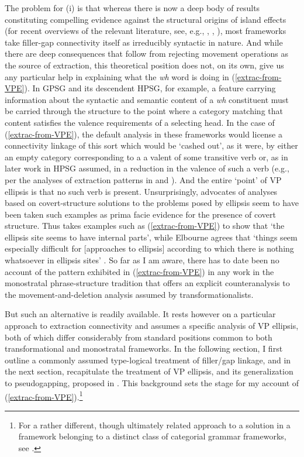 \documentclass[output=paper,colorlinks,citecolor=brown]{langscibook}
\begin{document}
The problem for (i) is that whereas there is now a deep body of
results constituting compelling evidence against the structural
origins of island effects (for recent overviews of the relevant
literature, see, e.g., \citet{chaves-putnam2020}, \citet{kubotalevineBook}, \citet{liu-et-al2022}),
most frameworks take filler-gap connectivity itself as irreducibly
syntactic in nature. And while there are deep consequences that follow
from rejecting movement operations as the source of extraction, this
theoretical position does not, on its own, give us any particular help
in explaining what the \textit{wh} word is doing in (\ref{extrac-from-VPE}). In
GPSG and its descendent HPSG, for example, a feature carrying
information about the syntactic and semantic content of a \textit{wh}
constituent must be carried through the structure to the point where a
category matching that content satisfies the valence requirements of a
selecting head. In the case of (\ref{extrac-from-VPE}), the default analysis
in these frameworks would license a connectivity linkage of this sort
which would be `cashed out', as it were, by either an empty category
corresponding to a a valent of some transitive verb or, as in later
work in HPSG assumed, in a reduction in the valence of such a verb
(e.g., per the analyses of extraction patterns in \citet{NoordBouma94} and
\citet{BoumaMaloufea01}). And the entire `point' of VP ellipsis is that no such
verb is present. Unsurprisingly, advocates of analyses based on
covert-structure solutions to the problems posed by ellipsis seem to
have been taken such examples as prima facie evidence for the presence
of covert structure.  Thus \citet{johnson2001} takes examples such as
(\ref{extrac-from-VPE}) to show that `the ellipsis site seems to have
internal parts', while Elbourne agrees that `things seem especially
difficult for [approaches to ellipsis] according to which there is
nothing whatsoever in ellipsis sites' \citep[216]{Elbourne2008}.  So far as I
am aware, there has to date been no account of the pattern exhibited
in (\ref{extrac-from-VPE}) in any work in the monostratal phrase-structure
tradition that offers an explicit counteranalysis to the
movement-and-deletion analysis assumed by transformationalists.

But such an alternative is readily available. It rests however on a
particular approach to extraction connectivity and assumes a specific
analysis of VP ellipsis, both of which differ considerably from
standard positions common to both transformational and monostratal
frameworks. In the following section, I first outline a commonly
assumed type-logical treatment of filler/gap linkage, and in the next
section, recapitulate the treatment of VP ellipsis, and its
generalization to pseudogapping, proposed in
\citet{kubota-levine-pseudo}. This background sets the stage for my account
of (\ref{extrac-from-VPE}).\footnote{For a rather different, though
ultimately related approach to a solution in a framework belonging to
a distinct class of categorial grammar frameworks, see \citet{jacobson1992}.}
\end{document}
